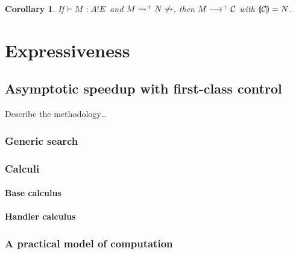 \documentclass[12pt,phd,lfcs,twoside,openright,logo,leftchapter,normalheadings]{infthesis}
\theoremstyle{plain}
\newtheorem{corollary}[theorem]{Corollary}
\theoremstyle{definition}
\begin{document}
\begin{corollary}
If $\vdash M : A ! E$ and $M \leadsto^+ N \not\leadsto$, then $M
\longrightarrow^+ \mathcal{C}$ with $\llparenthesis \mathcal{C} \rrparenthesis = N$.
\end{corollary}


\part{Expressiveness}


\chapter{Asymptotic speedup with first-class control}
\label{ch:handlers-efficiency}
Describe the methodology\dots
\section{Generic search}
\section{Calculi}
\subsection{Base calculus}
\subsection{Handler calculus}
\section{A practical model of computation}
\end{document}

